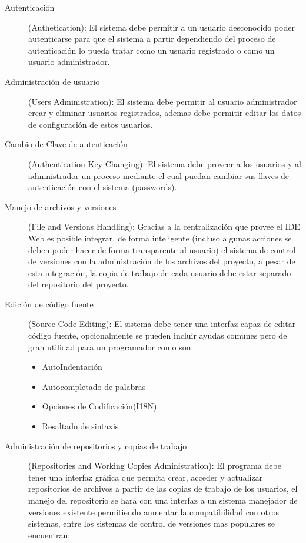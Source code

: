 \begin{description}
	
	\item [Autenticación] (Authetication): \newline
	El sistema debe permitir a un usuario desconocido poder autenticarse para que el sistema a partir dependiendo del proceso de autenticación lo pueda tratar como un usuario registrado o como un usuario administrador.
	
	\item [Administración de usuario] (Users Administration): \newline
	El sistema debe permitir al usuario administrador crear y eliminar usuarios registrados, ademas debe permitir editar los datos de configuración de estos usuarios.
	
	\item [Cambio de Clave de autenticación] (Authentication Key Changing): \newline
	El sistema debe proveer a los usuarios y al administrador un proceso mediante el cual puedan cambiar sus llaves de autenticación con el sistema (passwords).
	
	\item [Manejo de archivos y versiones] (File and Versions Handling): \newline
	Gracias a la centralización que provee el IDE Web es posible integrar, de forma inteligente (incluso algunas acciones se deben poder hacer de forma transparente al usuario) el sistema de control de versiones con la administración de los archivos del proyecto, a pesar de esta integración, la copia de trabajo de cada usuario debe estar separado del repositorio del proyecto.
	
	\item [Edición de código fuente] (Source Code Editing): \newline
	El sistema debe tener una interfaz capaz de editar código fuente, opcionalmente se pueden incluir ayudas comunes pero de gran utilidad para un programador como son:
	\begin{itemize}
		\item AutoIndentación
		\item Autocompletado de palabras
		\item Opciones de Codificación(I18N)
		\item Resaltado de sintaxis
	\end{itemize}
	
	\item [Administración de repositorios y copias de trabajo] (Repositories and Working Copies Administration): \newline
	El programa debe tener una interfaz gráfica que permita crear, acceder y actualizar repositorios de archivos a partir de las copias de trabajo de los usuarios, el manejo del repositorio se hará con una interfaz a un sistema manejador de versiones existente permitiendo aumentar la compatibilidad con otros sistemas, entre los sistemas de control de versiones mas populares se encuentran:
	

\end{description}
